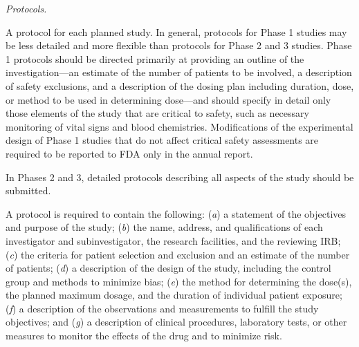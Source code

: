 \documentclass[11pt]{article}
\begin{document}
\begin{description}[leftmargin=0.5cm,style=sameline]
\item[(6)] \textit{Protocols.}
\begin{description}[leftmargin=0.8cm,style=sameline]
\item[(i)] A protocol for each planned study. In general, protocols for Phase 1 studies may be less detailed and more flexible than protocols for Phase 2 and 3 studies. Phase 1 protocols should be directed primarily at providing an outline of the investigation---an estimate of the number of patients to be involved, a description of safety exclusions, and a description of the dosing plan including duration, dose, or method to be used in determining dose---and should specify in detail only those elements of the study that are critical to safety, such as necessary monitoring of vital signs and blood chemistries. Modifications of the experimental design of Phase 1 studies that do not affect critical safety assessments are required to be reported to FDA only in the annual report.
\item[(ii)] In Phases 2 and 3, detailed protocols describing all aspects of the study should be submitted.
\item[(iii)] A protocol is required to contain the following: (\textit{a}) a statement of the objectives and purpose of the study; (\textit{b}) the name, address, and qualifications of each investigator and subinvestigator, the research facilities, and the reviewing IRB; (\textit{c}) the criteria for patient selection and exclusion and an estimate of the number of patients; (\textit{d}) a description of the design of the study, including the control group and methods to minimize bias; (\textit{e}) the method for determining the dose(s), the planned maximum dosage, and the duration of individual patient exposure; (\textit{f}) a description of the observations and measurements to fulfill the study objectives; and (\textit{g}) a description of clinical procedures, laboratory tests, or other measures to monitor the effects of the drug and to minimize risk.
\end{description}


\end{description}
\end{document}
